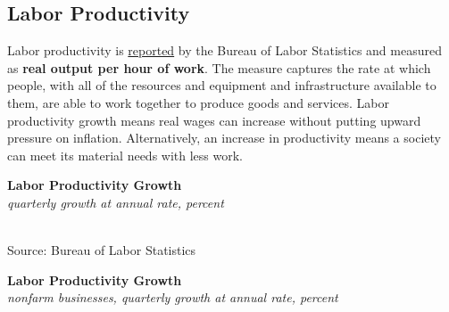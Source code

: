 \documentclass{report}
\makeatletter
\newcommand{\tbllink}[1]{\href{https://raw.githubusercontent.com/bdecon/US-chartbook/master/chartbook/data/#1}{\faTable}}
\newcommand*\short[1]{\expandafter\@gobbletwo\number\numexpr#1\relax}
\newcommand{\absnode}[3]{\node[below right, align=left] at (axis cs: #1,#2) {#3};}
\newcommand{\shdateaxisticks}{
		date coordinates in=x, axis line style={draw=none},
		xmax={2022-10-31},
		max space between ticks=40,	    
		xtick={{1990-01-01}, {1995-01-01}, {2000-01-01}, 
			{2005-01-01}, {2010-01-01}, {2015-01-01}, {2020-01-01}},
		minor xtick={},
		enlarge y limits={0.06}, enlarge x limits={0.01},
		}
\newcommand{\bbar}[2]{extra #1 ticks = {{#2}}, extra #1 tick labels = ,
		extra #1 tick style = {grid=major, grid style={thick, black!25}},}
\newcommand{\stdline}[4]{\addplot[very thick, no markers, color=#1] 
		table [x=#2, y=#3, col sep=comma] {#4};	}
\newcommand{\thickline}[4]{\addplot[ultra thick, no markers, color=#1] 
		table [x=#2, y=#3, col sep=comma] {#4};	}
\newcommand{\rbars}{
		\fill[color=black!10] (axis cs:{1990-07-01},\pgfkeysvalueof{/pgfplots/ymin}) rectangle 
			(axis cs:{1991-03-01}, \pgfkeysvalueof{/pgfplots/ymax});
		\fill[color=black!10] (axis cs:{2007-12-01},\pgfkeysvalueof{/pgfplots/ymin}) rectangle 
			(axis cs:{2009-07-01}, \pgfkeysvalueof{/pgfplots/ymax});
		\fill[color=black!10] (axis cs:{2001-03-01},\pgfkeysvalueof{/pgfplots/ymin}) rectangle 
			(axis cs:{2001-11-01}, \pgfkeysvalueof{/pgfplots/ymax});
		\fill[color=black!10] (axis cs:{2020-02-01},\pgfkeysvalueof{/pgfplots/ymin}) rectangle 
			(axis cs:{2020-05-01}, \pgfkeysvalueof{/pgfplots/ymax});}
\makeatother
\begin{document}
{\begin{minipage}{0.76\textwidth}
\subsection*{Labor Productivity}
\hypertarget{labprod}{}
\small Labor productivity is \href{https://www.bls.gov/news.release/prod2.nr0.htm}{reported} by the Bureau of Labor Statistics and measured as \textbf{real output per hour of work}. The measure captures the rate at which people, with all of the resources and equipment and infrastructure available to them, are able to work together to produce goods and services. Labor productivity growth means real wages can increase without putting upward pressure on inflation. Alternatively, an increase in productivity means a society can meet its material needs with less work.
\vspace{1mm}

\begin{minipage}{0.39\textwidth}
\small 
\end{minipage} \hfill \begin{minipage}{0.54\textwidth}
\normalsize \textbf{Labor Productivity Growth}\\
\footnotesize{\textit{quarterly growth at annual rate, percent}}\\
\hspace*{-2mm} \\
\footnotesize{Source: Bureau of Labor Statistics} \hfill \tbllink{prod_st_lt.csv}
\end{minipage} 
\vspace{1mm}


\vspace{1.0mm}

\normalsize \textbf{Labor Productivity Growth}\\
\footnotesize{\textit{nonfarm businesses, quarterly growth at annual rate, percent}}
\vspace{2.6cm}


\end{minipage}}
\end{document}
